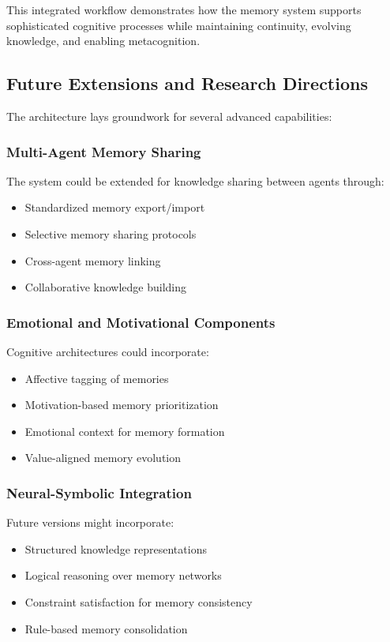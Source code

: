 \documentclass[12pt,a4paper]{article}
\begin{document}
This integrated workflow demonstrates how the memory system supports sophisticated cognitive processes while maintaining continuity, evolving knowledge, and enabling metacognition.

\subsection*{Future Extensions and Research Directions}

The architecture lays groundwork for several advanced capabilities:

\subsubsection*{Multi-Agent Memory Sharing}

The system could be extended for knowledge sharing between agents through:
\begin{itemize}
    \item Standardized memory export/import
    \item Selective memory sharing protocols
    \item Cross-agent memory linking
    \item Collaborative knowledge building
\end{itemize}

\subsubsection*{Emotional and Motivational Components}

Cognitive architectures could incorporate:
\begin{itemize}
    \item Affective tagging of memories
    \item Motivation-based memory prioritization
    \item Emotional context for memory formation
    \item Value-aligned memory evolution
\end{itemize}

\subsubsection*{Neural-Symbolic Integration}

Future versions might incorporate:
\begin{itemize}
    \item Structured knowledge representations
    \item Logical reasoning over memory networks
    \item Constraint satisfaction for memory consistency
    \item Rule-based memory consolidation
\end{itemize}
\end{document}
